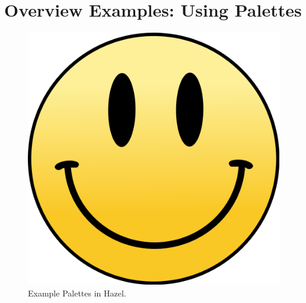 \section{Overview Examples: Using Palettes}
\label{sec:overview}

\begin{figure}

\includegraphics[scale=0.50]{images/MrSmileyFace.png}

\caption{Example Palettes in Hazel.}
\end{figure}

